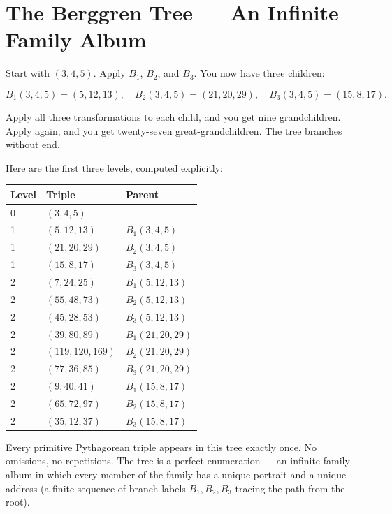 \ornbreak



\section{The Berggren Tree --- An Infinite Family Album}


Start with $(3, 4, 5)$. Apply $B_1$, $B_2$, and $B_3$. You now have three children:

\[
B_1(3, 4, 5) = (5, 12, 13), \quad B_2(3, 4, 5) = (21, 20, 29), \quad B_3(3, 4, 5) = (15, 8, 17).
\]

Apply all three transformations to each child, and you get nine grandchildren. Apply again, and you get twenty-seven great-grandchildren. The tree branches without end.

Here are the first three levels, computed explicitly:

\begin{center}
\small
\begin{tabular}{lll}
\toprule
Level & Triple & Parent \\
\midrule
0 & $(3, 4, 5)$ & --- \\
1 & $(5, 12, 13)$ & $B_1(3,4,5)$ \\
1 & $(21, 20, 29)$ & $B_2(3,4,5)$ \\
1 & $(15, 8, 17)$ & $B_3(3,4,5)$ \\
2 & $(7, 24, 25)$ & $B_1(5,12,13)$ \\
2 & $(55, 48, 73)$ & $B_2(5,12,13)$ \\
2 & $(45, 28, 53)$ & $B_3(5,12,13)$ \\
2 & $(39, 80, 89)$ & $B_1(21,20,29)$ \\
2 & $(119, 120, 169)$ & $B_2(21,20,29)$ \\
2 & $(77, 36, 85)$ & $B_3(21,20,29)$ \\
2 & $(9, 40, 41)$ & $B_1(15,8,17)$ \\
2 & $(65, 72, 97)$ & $B_2(15,8,17)$ \\
2 & $(35, 12, 37)$ & $B_3(15,8,17)$ \\
\bottomrule
\end{tabular}
\end{center}


Every primitive Pythagorean triple appears in this tree exactly once. No omissions, no repetitions. The tree is a perfect enumeration --- an infinite family album in which every member of the family has a unique portrait and a unique address (a finite sequence of branch labels $B_1, B_2, B_3$ tracing the path from the root).

